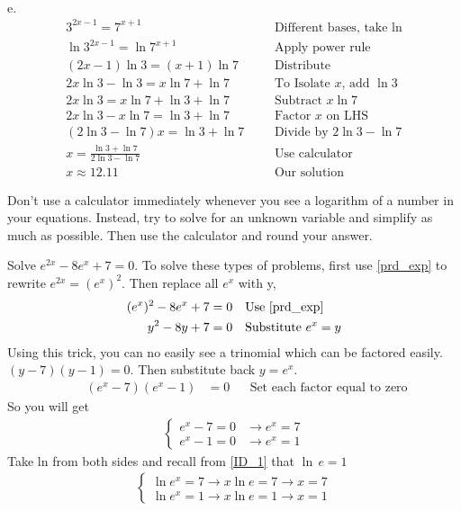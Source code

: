 \begin{exa}
\begin{align*}
	\end{align*}
e.	\begin{align*}
	    3^{2x-1} = 7^{x+1}&				&&\text{Different bases, take ln}\\
		\ln{3^{2x-1}} =\ln{7^{x+1}}&		&&\text{Apply power rule}\\
		(2x-1)\ln{3} = (x+1)\ln{7}&		&&\text{Distribute}\\
		2x\ln{3}-\ln{3} = x\ln{7}+\ln{7}&		&&\text{To Isolate $x$, add $\ln{3}$}\\
		2x\ln{3}= x\ln{7}+\ln{3}+\ln{7}&		&&\text{Subtract $x\ln{7}$}\\
		2x\ln{3} -x\ln{7}=\ln{3}+\ln{7}&		&&\text{Factor $x$ on LHS}\\
		(2\ln{3}-\ln{7})x = \ln{3}+\ln{7}&		&&\text{Divide by $2\ln{3}-\ln{7}$}\\
		x = \frac{\ln{3}+\ln{7}}{2\ln{3}-\ln{7}}& 	&&\text{Use calculator}\\
		x \approx 12.11&			&&\text{Our solution}
	\end{align*}
\end{exa}
\begin{nt}
Don't use a calculator immediately whenever you see a logarithm of a number in your 
equations. Instead, try to solve for an unknown variable and simplify as much as 
possible. Then use the calculator and round your answer.
\end{nt}
\begin{exa}
  Solve $e^{2x}-8e^{x}+7=0$.
 To solve these types of problems, first use \eqref{prd_exp} to rewrite $e^{2x}
 =(e^{x})^2$.  Then replace all $e^x$ with y,
 			\begin{align*}
 				(e^{x})^{2}-8e^x+7 &= 0 &&\text{Use \eqref{prd_exp}}\\
 				y^{2}-8y+7 &= 0  &&\text{Substitute $e^x=y$}
 			\end{align*}
 Using this trick, you can no easily see a trinomial which can be factored easily.
 $(y-7)(y-1)=0$. Then substitute back $y= e^{x}$.
 			\begin{align*}
 				\qquad (e^{x}-7)(e^{x}-1) &= 0 &&\text{Set each factor equal to zero}
 			\end{align*}
 So you will get
\begin{align*}
	\begin{cases}
		e^x-7=0 & \rightarrow e^x=7\\
		e^x-1=0 & \rightarrow e^x=1
	\end{cases}
\end{align*}
Take ln from both sides and recall from \eqref{ID_1} that $\ln{\,e}=1$
\begin{align*}
	\begin{cases}
		\ln{e^x}=7  \rightarrow x\ln{e}=7  \rightarrow x=7 \\
		\ln{e^x}=1  \rightarrow x\ln{e}=1  \rightarrow x=1
	\end{cases}
\end{align*}
\end{exa}
